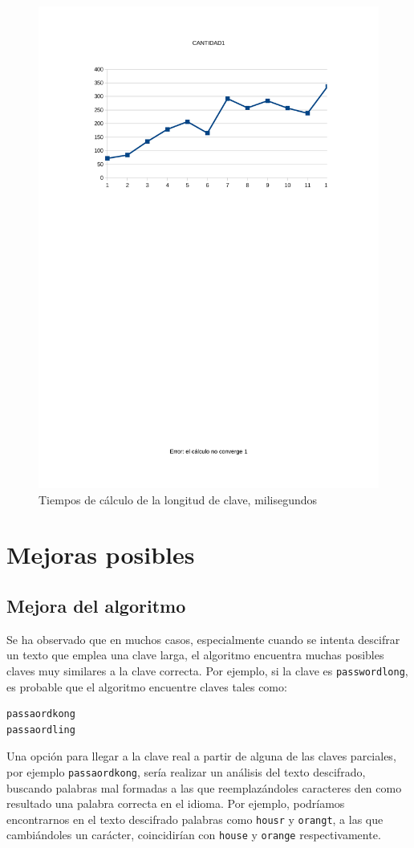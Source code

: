 \documentclass[12pt]{report}
\begin{document}
\begin{figure}
\includegraphics[width=1\textwidth]{img/kg.pdf}
\caption{Tiempos de cálculo de la longitud de clave, milisegundos}
\label{fig:kg}
\end{figure}

\section{Mejoras posibles}
\subsection{Mejora del algoritmo}
Se ha observado que en muchos casos, especialmente cuando se intenta descifrar un texto que emplea una clave larga, el algoritmo
encuentra muchas posibles claves muy similares a la clave correcta. Por ejemplo, si la clave es \texttt{passwordlong}, es probable que
el algoritmo encuentre claves tales como:
\begin{verbatim}
passaordkong
passaordling
\end{verbatim}
Una opción para llegar a la clave real a partir de alguna de las claves parciales, por ejemplo \texttt{passaordkong}, sería realizar un análisis del texto descifrado, buscando palabras mal formadas a las que reemplazándoles caracteres den como resultado una palabra correcta en el idioma. Por ejemplo, podríamos encontrarnos en el texto descifrado palabras como \texttt{housr} y \texttt{orangt}, a las que cambiándoles un carácter, coincidirían con \texttt{house} y \texttt{orange} respectivamente.
\end{document}
